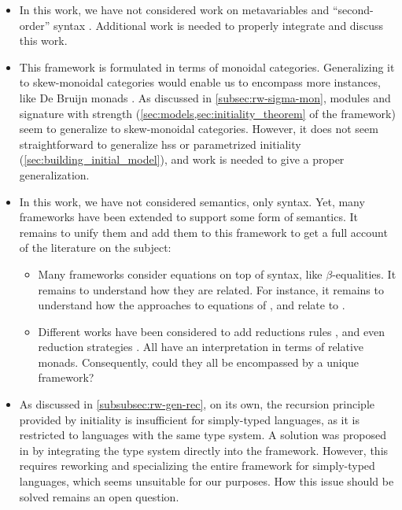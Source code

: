 \begin{itemize}
  \setlength\itemsep{-1pt}

  \item In this work, we have not considered work on metavariables and
        ``second-order'' syntax \cite{HamanaMetavar04,SecondOrderDep08}.
        Additional work is needed to properly integrate and discuss this work.

  \item This framework is formulated in terms of monoidal categories.
        Generalizing it to skew-monoidal categories would enable us to encompass
        more instances, like De Bruijn monads \cite{NamelessDummies22}.
        As discussed in \cref{subsec:rw-sigma-mon}, modules and signature with
        strength (\cref{sec:models,sec:initiality_theorem} of the framework)
        seem to generalize to skew-monoidal categories.
        However, it does not seem straightforward to generalize hss or parametrized
        initiality (\cref{sec:building_initial_model}), and work is needed to
        give a proper generalization.

  \item In this work, we have not considered semantics, only syntax.
        Yet, many frameworks have been extended to support some form of semantics.
        It remains to unify them and add them to this framework to get a full
        account of the literature on the subject:
        \begin{itemize}
          \item Many frameworks consider equations on top of syntax, like $β$-equalities.
                It remains to understand how they are related.
                For instance, it remains to understand how the approaches to equations of \cite{FioreHur10},
                and \cite{FioreSzamozvancevPopl22} relate to \cite{PresentableSignatures21,2Signatures19}.
          \item Different works have been considered to add reductions rules
                \cite{UntypedRelativeMonads16,TransitionMonads20}, and even
                reduction strategies \cite{TransitionMonads22}.
                All have an interpretation in terms of relative monads.
                Consequently, could they all be encompassed by a unique framework?
        \end{itemize}

  \item As discussed in \cref{subsubsec:rw-gen-rec}, on its own, the recursion
        principle provided by initiality is insufficient for simply-typed
        languages, as it is restricted to languages with the same type system.
        A solution was proposed in \cite{ExtendedInitiality12} by integrating
        the type system directly into the framework.
        However, this requires reworking and specializing the entire framework
        for simply-typed languages, which seems unsuitable for our purposes.
        How this issue should be solved remains an open question.


\end{itemize}
